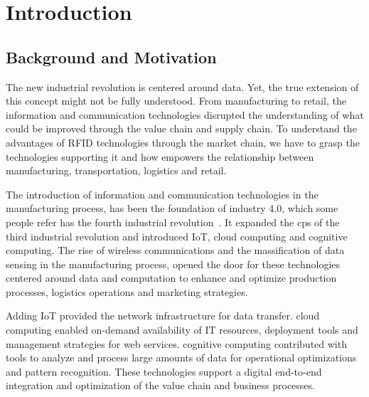 
\chapter{Introduction}

\section{Background and Motivation}

The new industrial revolution is centered around data. Yet, the true extension of this concept might not be fully understood.
From manufacturing to retail, the information and communication technologies disrupted the understanding of what could be improved through the \gls{value chain} and \gls{supply chain}. 
To understand the advantages of \gls{RFID} technologies through the market chain, we have to grasp the technologies supporting it and how empowers the relationship between manufacturing, transportation, logistics and retail.

The introduction of information and communication technologies in the manufacturing process, has been the foundation of \gls{industry 4.0}, which some people refer has the fourth industrial revolution~\cite{marrWhatIndustryHere}. It expanded the \gls{cps} of the third industrial revolution and introduced \gls{IoT}, \gls{cloud computing} and \gls{cognitive computing}.
The rise of wireless communications and the massification of data sensing in the manufacturing process, opened the door for these technologies centered around data and computation to enhance and optimize production processes, logistics operations and marketing strategies.

Adding \gls{IoT} provided the network infrastructure for data transfer. \gls{cloud computing} enabled on-demand availability of \gls{IT} resources, deployment tools and management strategies for \gls{web services}. \gls{cognitive computing} contributed with tools to analyze and process large amounts of data for operational optimizations and pattern recognition.
These technologies support a digital end-to-end integration and optimization of the \gls{value chain} and \gls{business processes}. 

